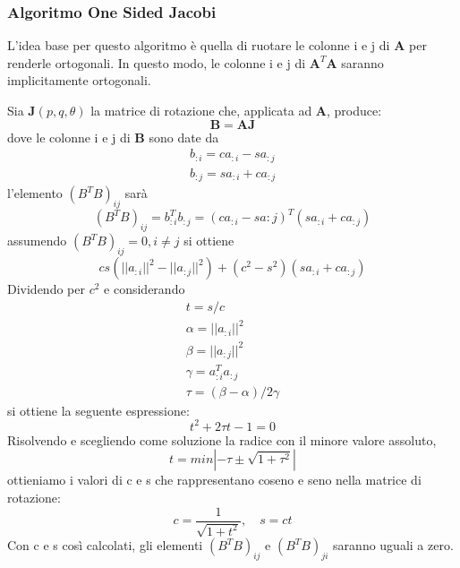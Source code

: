 \subsubsection{Algoritmo One Sided Jacobi}
L'idea base per questo algoritmo è quella di ruotare le colonne i e j di $\mathbf{A}$ per renderle ortogonali. In questo modo, le colonne i e j di $\mathbf{A}^T\mathbf{A}$ saranno implicitamente ortogonali.

Sia $\mathbf{J}(p,q,\theta)$ la matrice di rotazione che, applicata ad $\mathbf{A}$, produce:
\begin{equation}
\mathbf{B}=\mathbf{AJ}
\end{equation}
dove le colonne i e j di $\mathbf{B}$ sono date da
\begin{eqnarray}
b_{:i}=ca_{:i}-sa_{:j}\\
b_{:j}=sa_{:i}+ca_{:j}
\end{eqnarray}
l'elemento $(B^TB)_{ij}$ sarà
\[
(B^TB)_{ij}=b_{:i}^Tb_{:j}=(ca_{:i}-sa{:j})^T(sa_{:i}+ca_{:j})
\]
assumendo $(B^TB)_{ij}=0,i\neq j$ si ottiene
\[
cs(||a_{:i}||^2-||a_{:j}||^2)+(c^2-s^2)(sa_{:i}+ca_{:j})
\]
Dividendo per $c^2$ e considerando
\begin{equation*}
\begin{aligned}
t=s/c\\
\alpha = ||a_{:i}||^2\\
\beta = ||a_{:j}||^2\\
\gamma = a_{:i}^Ta_{:j}\\
\tau =(\beta - \alpha)/2\gamma
\end{aligned}
\end{equation*}
si ottiene la seguente espressione:
\begin{equation}
t^2+2\tau t-1=0
\end{equation}
Risolvendo e scegliendo come soluzione la radice con il minore valore assoluto,
\begin{equation}
t=min|-\tau\pm\sqrt{1+\tau^2}|
\end{equation}
ottieniamo i valori di c e s che rappresentano coseno e seno nella matrice di rotazione:
\begin{equation}
c=\frac{1}{\sqrt{1+t^2}},\quad s=ct
\end{equation}
Con c e s così calcolati, gli elementi $(B^TB)_{ij}$ e $(B^TB)_{ji}$ saranno uguali a zero.



